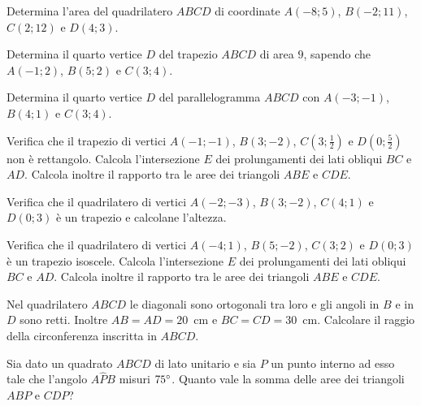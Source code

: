 \begin{multicols}{2}
\begin{esercizio}
\label{ese:7.93}
Determina l'area del quadrilatero $ABCD$ di coordinate $A(-8;5)$, $B(-2;11)$, $C(2;12)$ e $D(4;3)$.
\end{esercizio}

\begin{esercizio}
\label{ese:7.94}
Determina il quarto vertice $D$ del trapezio $ABCD$ di area $9$, sapendo che $A(-1;2)$, $B(5;2)$ e $C(3;4)$.
\end{esercizio}

\begin{esercizio}
\label{ese:7.95}
Determina il quarto vertice $D$ del parallelogramma $ABCD$ con $A(-3;-1)$, $B(4;1)$ e $C(3;4)$.
\end{esercizio}

\begin{esercizio}
\label{ese:7.96}
Verifica che il trapezio di vertici $A(-1;-1)$, $B(3;-2)$, $C\left(3;\frac{1}{2}\right)$ e $D\left(0;\frac{5}{2}\right)$ non è rettangolo. Calcola l'intersezione $E$ dei prolungamenti dei lati obliqui $BC$ e $AD$. Calcola inoltre il rapporto tra le aree dei triangoli $ABE$ e $CDE$.
\end{esercizio}

\begin{esercizio}
\label{ese:7.97}
Verifica che il quadrilatero di vertici $A(-2;-3)$, $B(3;-2)$, $C(4;1)$ e $D(0;3)$ è un trapezio e calcolane l'altezza.
\end{esercizio}

\begin{esercizio}
\label{ese:7.98}
Verifica che il quadrilatero di vertici $A(-4;1)$, $B(5;-2)$, $C(3;2)$ e $D(0;3)$ è un trapezio isoscele. Calcola l'intersezione $E$ dei prolungamenti dei lati obliqui $BC$ e $AD$. Calcola inoltre il rapporto tra le aree dei triangoli $ABE$ e $CDE$.
\end{esercizio}

\begin{esercizio}
\label{ese:7.99}
Nel quadrilatero $ABCD$ le diagonali sono ortogonali tra loro e gli angoli in $B$ e in $D$ sono retti. Inoltre $AB=AD=20$~cm e $BC=CD=30$~cm. Calcolare il raggio della circonferenza inscritta in $ABCD$.
\end{esercizio}

\begin{esercizio}
\label{ese:7.100}
Sia dato un quadrato $ABCD$ di lato unitario e sia $P$ un punto interno ad esso tale che l'angolo $A\widehat{P}B$ misuri $75{}^{\circ}$. Quanto vale la somma delle aree dei triangoli $ABP$ e $CDP$? 
\end{esercizio}


\end{multicols}
